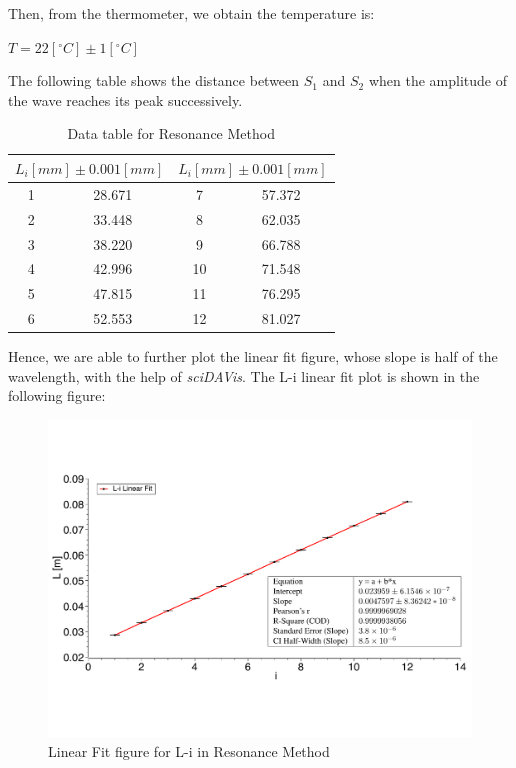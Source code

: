 \documentclass[a4paper,12pt]{article}
\begin{document}
Then, from the thermometer, we obtain the temperature is:

\begin{center}
$T = 22[^{\circ}C] \pm 1[^{\circ}C]$
\end{center}

The following table shows the distance between \textit{$S_1$} and \textit{$S_2$} when the amplitude of the wave reaches its peak successively. 

\begin{table}[h]
\begin{center}
\begin{tabular}{|c|c||c|c|}
\hline
\multicolumn{2}{|c||}{$L_i[mm] \pm 0.001[mm]$} & \multicolumn{2}{c|}{$L_i[mm] \pm 0.001[mm]$}\\
\hline
1 & 28.671 & 7 & 57.372 \\
2 & 33.448 & 8 & 62.035 \\
3 & 38.220 & 9 & 66.788 \\
4 & 42.996 & 10 & 71.548 \\
5 & 47.815 & 11 & 76.295 \\
6 & 52.553 & 12 & 81.027 \\
\hline
\end{tabular}
\caption{Data table for Resonance Method}
\end{center}
\end{table}

Hence, we are able to further plot the linear fit figure, whose slope is half of the wavelength, with the help of \textit{sciDAVis}. The L-i linear fit plot is shown in the following figure: \par

\begin{figure}[h] 
    \centering
    \includegraphics[width=1.04\textwidth]{Fig7_2} 
    \caption{Linear Fit figure for L-i in Resonance Method} 
\end{figure}
\end{document}
